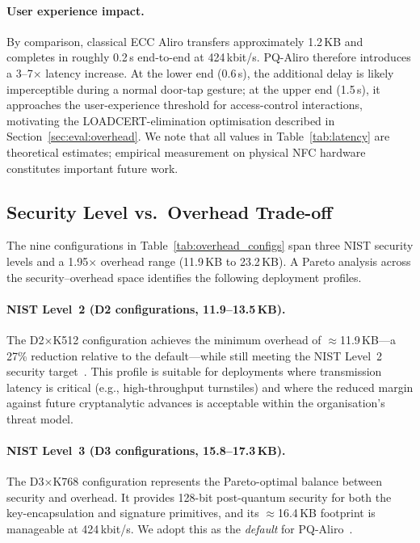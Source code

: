 \paragraph{User experience impact.}
By comparison, classical ECC Aliro transfers approximately 1.2\,KB and
completes in roughly 0.2\,s end-to-end at 424\,kbit/s.  PQ-Aliro therefore
introduces a 3–7$\times$ latency increase.  At the lower end (0.6\,s), the
additional delay is likely imperceptible during a normal door-tap gesture;
at the upper end (1.5\,s), it approaches the user-experience threshold for
access-control interactions, motivating the LOADCERT-elimination optimisation
described in Section~\ref{sec:eval:overhead}.  We note that all values in
Table~\ref{tab:latency} are theoretical estimates; empirical measurement on
physical NFC hardware constitutes important future work.

\subsection{Security Level vs.\ Overhead Trade-off}
\label{sec:eval:tradeoff}

The nine configurations in Table~\ref{tab:overhead_configs} span three
NIST security levels and a 1.95$\times$ overhead range (11.9\,KB to
23.2\,KB).  A Pareto analysis across the security–overhead space identifies
the following deployment profiles.

\paragraph{NIST Level~2 (D2 configurations, 11.9–13.5\,KB).}
The D2$\times$K512 configuration achieves the minimum overhead of
$\approx$11.9\,KB—a 27\% reduction relative to the default—while still
meeting the NIST Level~2 security target~\cite{NIST:FIPS203,NIST:FIPS204}.
This profile is suitable for deployments where transmission latency is
critical (e.g., high-throughput turnstiles) and where the reduced margin
against future cryptanalytic advances is acceptable within the organisation's
threat model.

\paragraph{NIST Level~3 (D3 configurations, 15.8–17.3\,KB).}
The D3$\times$K768 configuration represents the Pareto-optimal balance
between security and overhead.  It provides 128-bit post-quantum security
for both the key-encapsulation and signature primitives, and its $\approx$16.4\,KB
footprint is manageable at 424\,kbit/s.  We adopt this as the \emph{default}
for PQ-Aliro~\cite{NIST:FIPS203,NIST:FIPS204}.

